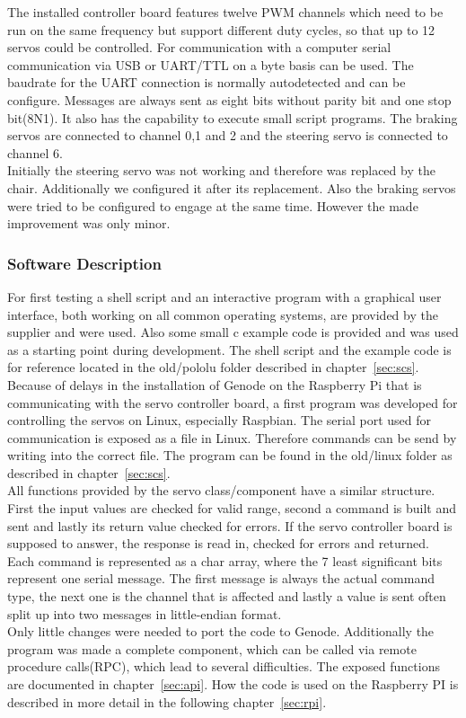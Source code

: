 The installed controller board features twelve PWM channels which need to be run on the same frequency but support different duty cycles, so that up to 12 servos could be controlled. For communication with a computer serial communication via USB or UART/TTL on a byte basis can be used. The baudrate for the UART connection is normally autodetected and can be configure. Messages are always sent as eight bits without parity bit and one stop bit(8N1). It also has the capability to execute small script programs. The braking servos are connected to channel 0,1 and 2 and the steering servo is connected to channel 6.\\

Initially the steering servo was not working and therefore was replaced by the chair. Additionally we configured it after its replacement. Also the braking servos were tried to be configured to engage at the same time. However the made improvement was only minor.

\subsubsection{Software Description}
For first testing a shell script and an interactive program with a graphical user interface, both working on all common operating systems, are provided by the supplier and were used. Also some small c example code is provided and was used as a starting point during development. The shell script and the example code is for reference located in the old/pololu folder described in chapter~\ref{sec:scs}.\\

Because of delays in the installation of Genode on the Raspberry Pi that is communicating with the servo controller board, a first program was developed for controlling the servos on Linux, especially Raspbian. The serial port used for communication is exposed as a file in Linux. Therefore commands can be send by writing into the correct file. The program can be found in the old/linux folder as described in chapter~\ref{sec:scs}.\\

All functions provided by the servo class/component have a similar structure. First the input values are checked for valid range, second a command is built and sent and lastly its return value checked for errors. If the servo controller board is supposed to answer, the response is read in, checked for errors and returned. Each command is represented as a char array, where the 7 least significant bits represent one serial message. The first message is always the actual command type, the next one is the channel that is affected and lastly a value is sent often split up into two messages in little-endian format.\\

Only little changes were needed to port the code to Genode. Additionally the program was made a complete component, which can be called via remote procedure calls(RPC), which lead to several difficulties. The exposed functions are documented in chapter~\ref{sec:api}. How the code is used on the Raspberry PI is described in more detail in the following chapter~\ref{sec:rpi}.